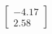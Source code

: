 \documentclass[preview]{standalone}
\begin{document}
\begin{align*}
\begin{bmatrix} -4.17 \\ 2.58 \end{bmatrix}
\end{align*}
\end{document}
